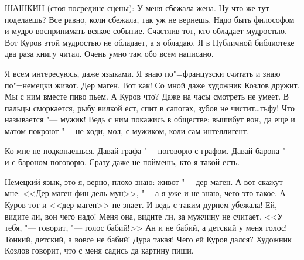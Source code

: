
ШАШКИН  (стоя посредине сцены):  У  меня
сбежала жена. Ну что же  тут поделаешь?  Все
равно, коли сбежала, так уж не вернешь. Надо
быть философом и мудро  воспринимать  всякое
событие. Счастлив тот,  кто обладает  мудростью. 
Вот Куров этой мудростью  не обладает,
а  я  обладаю.  Я в Публичной библиотеке два
раза  книгу читал. Очень  умно там обо  всем
написано.
    
Я всем интересуюсь, даже языками. Я знаю
по"=французски считать и знаю по"=немецки  живот. Дер маген. Вот как! 
Со мной даже художник  Козлов  дружит.  Мы  с  ним вместе пиво
пьем. А Куров что? Даже на часы  смотреть не
умеет. В пальцы сморкается, рыбу вилкой ест,
спит в сапогах, зубов не чистит\dots тьфу! Что
называется "--- мужик!  Ведь с ним  покажись  в
обществе: вышибут вон, да еще и матом покроют  "---  не ходи, мол, с мужиком, коли сам интеллигент.
    
Ко  мне не подкопаешься.  Давай графа  "---
поговорю с графом. Давай барона  "--- и с бароном 
поговорю. Сразу даже не поймешь,  кто  я
такой есть.
    
Немецкий язык, это я, верно, плохо знаю:
живот "--- дер маген.  А вот  скажут мне:  <<Дер
маген фин дель мун>>,  "---  а  я уже и не знаю,
чего это такое. А Куров тот и <<дер маген>> не
знает.  И ведь с таким дурнем  убежала!  Ей,
видите ли, вон чего надо!  Меня она,  видите
ли, за мужчину не считает. <<У тебя, "---  говорит, "--- голос бабий!>> Ан и не бабий,  
а  детский у меня голос!  Тонкий, детский, а вовсе
не бабий!  Дура такая!  Чего ей Куров дался?
Художник  Козлов говорит,  что с меня садись
да картину пиши.

